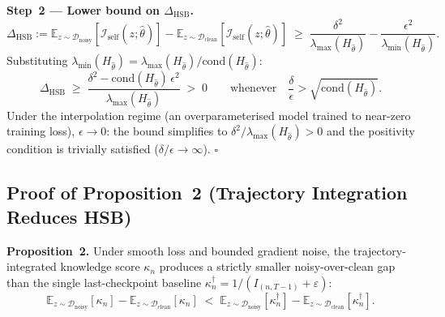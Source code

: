 \documentclass[runningheads]{llncs}
\begin{document}
\textbf{Step~2 --- Lower bound on $\Delta_\text{HSB}$.}
\begin{equation}
    \Delta_\text{HSB}
    := \mathbb{E}_{z \sim \mathcal{D}_\text{noisy}}[\mathcal{I}_\text{self}(z;\hat\theta)]
     - \mathbb{E}_{z \sim \mathcal{D}_\text{clean}}[\mathcal{I}_\text{self}(z;\hat\theta)]
    \;\geq\; \frac{\delta^2}{\lambda_{\max}(H_{\hat\theta})} - \frac{\epsilon^2}{\lambda_{\min}(H_{\hat\theta})}.
\end{equation}
Substituting $\lambda_{\min}(H_{\hat\theta}) = \lambda_{\max}(H_{\hat\theta})/\mathrm{cond}(H_{\hat\theta})$:
\begin{equation}
    \Delta_\text{HSB}
    \;\geq\; \frac{\delta^2 - \mathrm{cond}(H_{\hat\theta})\,\epsilon^2}{\lambda_{\max}(H_{\hat\theta})}
    \;>\; 0
    \qquad \text{whenever} \quad \frac{\delta}{\epsilon} > \sqrt{\mathrm{cond}(H_{\hat\theta})}.
\end{equation}
Under the interpolation regime (an overparameterised model trained to near-zero training loss), $\epsilon \to 0$: the bound simplifies to $\delta^2/\lambda_{\max}(H_{\hat\theta}) > 0$ and the positivity condition is trivially satisfied ($\delta/\epsilon \to \infty$). $\square$

\subsection{Proof of Proposition~2 (Trajectory Integration Reduces HSB)}
\label{app:proof-traj}

\textbf{Proposition~2.}
Under smooth loss and bounded gradient noise, the trajectory-integrated knowledge score $\kappa_n$ produces a strictly smaller noisy-over-clean gap than the single last-checkpoint baseline $\kappa^\dagger_n = 1/(I_{(n,T-1)} + \varepsilon)$:
\begin{equation}
    \mathbb{E}_{z \sim \mathcal{D}_\text{noisy}}[\kappa_n]
    - \mathbb{E}_{z \sim \mathcal{D}_\text{clean}}[\kappa_n]
    \;<\;
    \mathbb{E}_{z \sim \mathcal{D}_\text{noisy}}[\kappa^\dagger_n]
    - \mathbb{E}_{z \sim \mathcal{D}_\text{clean}}[\kappa^\dagger_n].
\end{equation}
\end{document}
